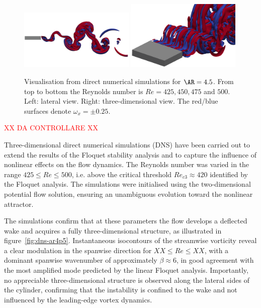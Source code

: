 \begin{figure}
  \includegraphics[trim={0 250 0 200},clip,width=0.49\textwidth]{./fig/AR4p5/omegax_Re500_2D.png}
  \includegraphics[trim={10 0 10 0},clip,width=0.49\textwidth]{./fig/AR4p5/omegax_Re500_3D.png} 
  \caption{Visualisation from direct numerical simulations for $\AR=4.5$. From top to bottom the Reynolds number is $Re=425,450,475$ and $500$. Left: lateral view. Right: three-dimensional view. The red/blue surfaces denote $\omega_x = \pm 0.25$.}
  \label{fig:viewdns-ar4p5}       
\end{figure}

\textcolor{red}{XX DA CONTROLLARE XX}



Three-dimensional direct numerical simulations (DNS) have been carried out to extend the results of the Floquet stability analysis and to capture the influence of nonlinear effects on the flow dynamics. The Reynolds number was varied in the range $425 \le Re \le 500$, i.e. above the critical threshold $Re_{c3} \approx 420$ identified by the Floquet analysis. The simulations were initialised using the two-dimensional potential flow solution, ensuring an unambiguous evolution toward the nonlinear attractor.

The simulations confirm that at these parameters the flow develops a deflected wake and acquires a fully three-dimensional structure, as illustrated in figure~\ref{fig:dns-ar4p5}. Instantaneous isocontours of the streamwise vorticity reveal a clear modulation in the spanwise direction for $ XX \le Re \le XX $, with a dominant spanwise wavenumber of approximately $\beta \approx 6$, in good agreement with the most amplified mode predicted by the linear Floquet analysis. Importantly, no appreciable three-dimensional structure is observed along the lateral sides of the cylinder, confirming that the instability is confined to the wake and not influenced by the leading-edge vortex dynamics.

